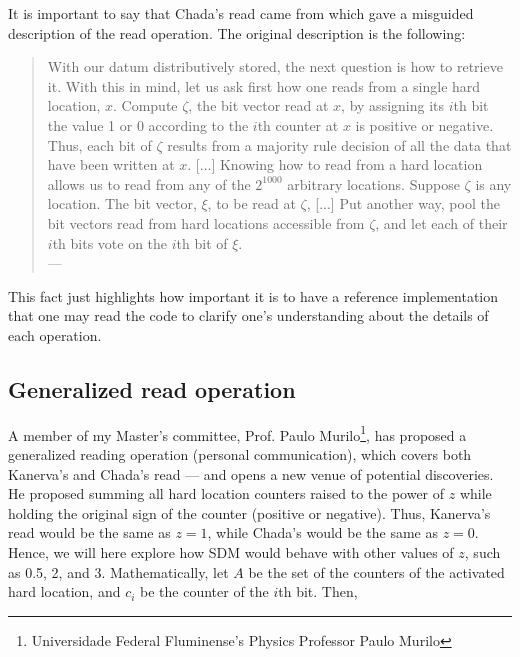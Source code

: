 It is important to say that Chada's read came from \citet{anwar2003sparse} which gave a misguided description of the read operation. The original description is the following:

\begin{samepage}
\begin{quote}
With our datum distributively stored, the next question is how to retrieve it. With this in mind, let us ask first how one reads from a single hard location, $x$. Compute $\zeta$, the bit vector read at $x$, by assigning its $i$th bit the value 1 or 0 according to the $i$th counter at $x$ is positive or negative. Thus, each bit of $\zeta$ results from a majority rule decision of all the data that have been written at $x$. [...] Knowing how to read from a hard location allows us to read from any of the $2^{1000}$ arbitrary locations. Suppose $\zeta$ is any location. The bit vector, $\xi$, to be read at $\zeta$, [...] Put another way, pool the bit vectors read from hard locations accessible from $\zeta$, and let each of their $i$th bits vote on the $i$th bit of $\xi$. \\
\hfill --- \citet[p.342]{anwar2003sparse}
\end{quote}
\end{samepage}

This fact just highlights how important it is to have a reference implementation that one may read the code to clarify one's understanding about the details of each operation.

\subsection{Generalized read operation}

A member of my Master's committee, Prof. Paulo Murilo\footnote{Universidade Federal Fluminense's Physics Professor Paulo Murilo}, has proposed a generalized reading operation (personal communication), which covers both Kanerva's and Chada's read --- and opens a new venue of potential discoveries. He proposed summing all hard location counters raised to the power of $z$ while holding the original sign of the counter (positive or negative). Thus, Kanerva's read would be the same as $z=1$, while Chada's would be the same as $z=0$. Hence, we will here explore how SDM would behave with other values of $z$, such as 0.5, 2, and 3. Mathematically, let $A$ be the set of the counters of the activated hard location, and $c_i$ be the counter of the $i$th bit. Then,

